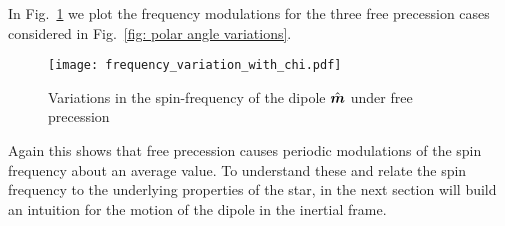 \documentclass[../full_thesis/full_thesis.tex]{subfiles}
\begin{document}
In Fig.~\ref{fig: frequency variations} we plot the frequency modulations for the
three free precession cases considered in Fig.~\eqref{fig: polar angle variations}.
\begin{figure}[ht]
\centering
  \texttt{[image: frequency\_variation\_with\_chi.pdf]}
\caption{Variations in the spin-frequency of the dipole $\hat{\boldsymbol{m}}$ under free precession}
\label{fig: frequency variations}
\end{figure}
Again this shows that free precession causes periodic modulations of the spin
frequency about an average value. To understand these and relate the spin
frequency to the underlying properties of the star, in the next section will
build an intuition for the motion of the dipole in the inertial frame.




%
%
%
\end{document}
